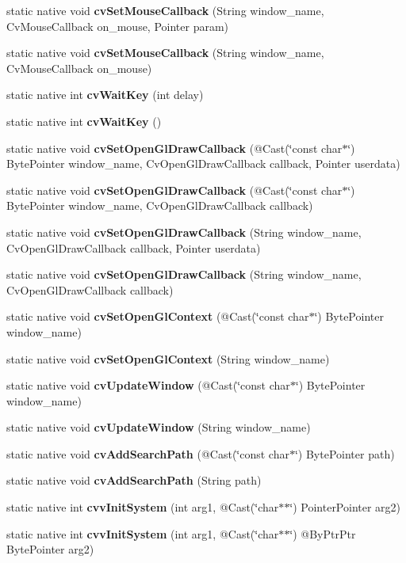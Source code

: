 \begin{DoxyCompactItemize}
\item 
static native void {\bfseries cv\+Set\+Mouse\+Callback} (String window\+\_\+name, Cv\+Mouse\+Callback on\+\_\+mouse, Pointer param)
\item 
static native void {\bfseries cv\+Set\+Mouse\+Callback} (String window\+\_\+name, Cv\+Mouse\+Callback on\+\_\+mouse)
\item 
static native int {\bfseries cv\+Wait\+Key} (int delay)
\item 
static native int {\bfseries cv\+Wait\+Key} ()
\item 
static native void {\bfseries cv\+Set\+Open\+Gl\+Draw\+Callback} (@Cast(\char`\"{}const char$\ast$\char`\"{}) Byte\+Pointer window\+\_\+name, Cv\+Open\+Gl\+Draw\+Callback callback, Pointer userdata)
\item 
static native void {\bfseries cv\+Set\+Open\+Gl\+Draw\+Callback} (@Cast(\char`\"{}const char$\ast$\char`\"{}) Byte\+Pointer window\+\_\+name, Cv\+Open\+Gl\+Draw\+Callback callback)
\item 
static native void {\bfseries cv\+Set\+Open\+Gl\+Draw\+Callback} (String window\+\_\+name, Cv\+Open\+Gl\+Draw\+Callback callback, Pointer userdata)
\item 
static native void {\bfseries cv\+Set\+Open\+Gl\+Draw\+Callback} (String window\+\_\+name, Cv\+Open\+Gl\+Draw\+Callback callback)
\item 
static native void {\bfseries cv\+Set\+Open\+Gl\+Context} (@Cast(\char`\"{}const char$\ast$\char`\"{}) Byte\+Pointer window\+\_\+name)
\item 
static native void {\bfseries cv\+Set\+Open\+Gl\+Context} (String window\+\_\+name)
\item 
static native void {\bfseries cv\+Update\+Window} (@Cast(\char`\"{}const char$\ast$\char`\"{}) Byte\+Pointer window\+\_\+name)
\item 
static native void {\bfseries cv\+Update\+Window} (String window\+\_\+name)
\item 
static native void {\bfseries cv\+Add\+Search\+Path} (@Cast(\char`\"{}const char$\ast$\char`\"{}) Byte\+Pointer path)
\item 
static native void {\bfseries cv\+Add\+Search\+Path} (String path)
\item 
static native int {\bfseries cvv\+Init\+System} (int arg1, @Cast(\char`\"{}char$\ast$$\ast$\char`\"{}) Pointer\+Pointer arg2)
\item 
static native int {\bfseries cvv\+Init\+System} (int arg1, @Cast(\char`\"{}char$\ast$$\ast$\char`\"{}) @By\+Ptr\+Ptr Byte\+Pointer arg2)

\end{DoxyCompactItemize}
